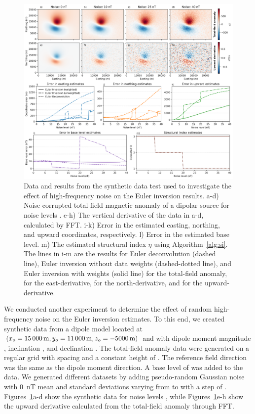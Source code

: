 \begin{figure}[tb!]
\centering
\includegraphics[width=1\linewidth]{figures/synthetic-noise-levels.png}
\caption{
    Data and results from the synthetic data test used to investigate the effect of high-frequency noise on the Euler inversion results.
    a-d) Noise-corrupted total-field magnetic anomaly of a dipolar source for noise levels \SynNoisePlotted.
    e-h) The vertical derivative of the data in a-d, calculated by FFT.
    i-k) Error in the estimated easting, northing, and upward coordinates, respectively.
    l) Error in the estimated base level.
    m) The estimated structural index $\eta$ using Algorithm~\ref{alg:si}.
    The lines in i-m are the results for Euler deconvolution (dashed line), Euler inversion without data weights (dashed-dotted line), and Euler inversion with weights (solid line) \SynNoiseWeightsF{} for the total-field anomaly, \SynNoiseWeightsE{} for the east-derivative, \SynNoiseWeightsN{} for the north-derivative, and \SynNoiseWeightsU{} for the upward-derivative.
}
\label{fig:noise}
\end{figure}

We conducted another experiment to determine the effect of random high-frequency noise on the Euler inversion estimates.
To this end, we created synthetic data from a dipole model located at $(x_o=\SynNoiseTrueEast, y_o=\SynNoiseTrueNorth, z_o=\SynNoiseTrueUp)$ and with dipole moment magnitude \SynNoiseInt{}, inclination \SynNoiseInc, and declination \SynNoiseDec.
The total-field anomaly data were generated on a regular grid with spacing \SynNoiseSpacing{} and a constant height of \SynNoiseHeight.
The reference field direction was the same as the dipole moment direction.
A base level of \SynNoiseTrueBase{} was added to the data.
We generated different datasets by adding pseudo-random Gaussian noise with \qty{0}{\nano\tesla} mean and standard deviations varying from \SynNoiseMin{} to \SynNoiseMax{} with a step of \SynNoiseStep{}.
Figures~\ref{fig:noise}a-d show the synthetic data for noise levels \SynNoisePlotted, while Figures~\ref{fig:noise}e-h show the upward derivative calculated from the total-field anomaly through FFT.

